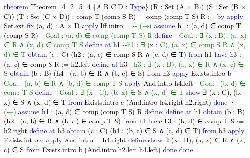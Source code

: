 \documentclass[
  letterpaper,
  DIV=11,
  numbers=noendperiod]{scrreprt}
\newenvironment{Shaded}{\begin{snugshade}}{\end{snugshade}}
\newcommand{\CommentTok}[1]{\textcolor[rgb]{0.37,0.37,0.37}{#1}}
\newcommand{\KeywordTok}[1]{\textcolor[rgb]{0.00,0.23,0.31}{#1}}
\newcommand{\NormalTok}[1]{\textcolor[rgb]{0.00,0.23,0.31}{#1}}
\renewcommand{\NormalTok}[1]{\textcolor[HTML]{000000}{#1}}
\renewcommand{\KeywordTok}[1]{\textcolor[HTML]{0000FF}{#1}}
\renewcommand{\CommentTok}[1]{\textcolor[HTML]{008000}{#1}}
\theoremstyle{remark}
\begin{document}
\begin{Shaded}
\begin{Highlighting}[]
\KeywordTok{theorem}\NormalTok{ Theorem\_4\_2\_5\_4 \{A B C D : }\KeywordTok{Type}\NormalTok{\}}
\NormalTok{    (R : Set (A × B)) (S : Set (B × C)) (T : Set (C × D)) :}
\NormalTok{    comp T (comp S R) = comp (comp T S) R := }\KeywordTok{by}
  \KeywordTok{apply}\NormalTok{ Set.ext}
  \KeywordTok{fix}\NormalTok{ (a, d) : A × D}
  \KeywordTok{apply}\NormalTok{ Iff.intro}
\NormalTok{  · }\CommentTok{{-}{-} (→)}
    \KeywordTok{assume}\NormalTok{ h1 : (a, d) ∈ comp T (comp S R)}
                     \CommentTok{{-}{-}Goal : (a, d) ∈ comp (comp T S) R}
    \KeywordTok{define}           \CommentTok{{-}{-}Goal : ∃ (x : B), (a, x) ∈ R ∧ (x, d) ∈ comp T S}
    \KeywordTok{define} \KeywordTok{at}\NormalTok{ h1     }\CommentTok{{-}{-}h1 : ∃ (x : C), (a, x) ∈ comp S R ∧ (x, d) ∈ T}
    \KeywordTok{obtain}\NormalTok{ (c : C) (h2 : (a, c) ∈ comp S R ∧ (c, d) ∈ T) }\KeywordTok{from}\NormalTok{ h1}
    \KeywordTok{have}\NormalTok{ h3 : (a, c) ∈ comp S R := h2.left}
    \KeywordTok{define} \KeywordTok{at}\NormalTok{ h3     }\CommentTok{{-}{-}h3 : ∃ (x : B), (a, x) ∈ R ∧ (x, c) ∈ S}
    \KeywordTok{obtain}\NormalTok{ (b : B) (h4 : (a, b) ∈ R ∧ (b, c) ∈ S) }\KeywordTok{from}\NormalTok{ h3}
    \KeywordTok{apply}\NormalTok{ Exists.intro b    }\CommentTok{{-}{-}Goal : (a, b) ∈ R ∧ (b, d) ∈ comp T S}
    \KeywordTok{apply}\NormalTok{ And.intro h4.left }\CommentTok{{-}{-}Goal : (b, d) ∈ comp T S}
    \KeywordTok{define}                  \CommentTok{{-}{-}Goal : ∃ (x : C), (b, x) ∈ S ∧ (x, d) ∈ T}
    \KeywordTok{show}\NormalTok{ ∃ (x : C), (b, x) ∈ S ∧ (x, d) ∈ T }\KeywordTok{from}
\NormalTok{      Exists.intro c (And.intro h4.right h2.right)}
    \KeywordTok{done}
\NormalTok{  · }\CommentTok{{-}{-} (←)}
    \KeywordTok{assume}\NormalTok{ h1 : (a, d) ∈ comp (comp T S) R}
    \KeywordTok{define}\NormalTok{; }\KeywordTok{define} \KeywordTok{at}\NormalTok{ h1}
    \KeywordTok{obtain}\NormalTok{ (b : B) (h2 : (a, b) ∈ R ∧ (b, d) ∈ comp T S) }\KeywordTok{from}\NormalTok{ h1}
    \KeywordTok{have}\NormalTok{ h3 : (b, d) ∈ comp T S := h2.right}
    \KeywordTok{define} \KeywordTok{at}\NormalTok{ h3}
    \KeywordTok{obtain}\NormalTok{ (c : C) (h4 : (b, c) ∈ S ∧ (c, d) ∈ T) }\KeywordTok{from}\NormalTok{ h3}
    \KeywordTok{apply}\NormalTok{ Exists.intro c}
    \KeywordTok{apply}\NormalTok{ And.intro \_ h4.right}
    \KeywordTok{define}
    \KeywordTok{show}\NormalTok{ ∃ (x : B), (a, x) ∈ R ∧ (x, c) ∈ S }\KeywordTok{from}
\NormalTok{      Exists.intro b (And.intro h2.left h4.left)}
    \KeywordTok{done}
  \KeywordTok{done}
\end{Highlighting}
\end{Shaded}
\end{document}

